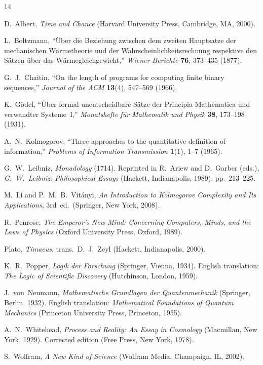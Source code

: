 \documentclass[12pt]{article}
\theoremstyle{plain}
\theoremstyle{definition}
\theoremstyle{remark}
\begin{document}
\begin{thebibliography}{14}

D.~Albert, \emph{Time and Chance} (Harvard University Press, Cambridge, MA, 2000).

L.~Boltzmann, ``\"Uber die Beziehung zwischen dem zweiten Hauptsatze der mechanischen W\"armetheorie und der Wahrscheinlichkeitsrechnung respektive den S\"atzen \"uber das W\"armegleichgewicht,'' \emph{Wiener Berichte} \textbf{76}, 373--435 (1877).

G.~J.~Chaitin, ``On the length of programs for computing finite binary sequences,'' \emph{Journal of the ACM} \textbf{13}(4), 547--569 (1966).

K.~G\"odel, ``\"Uber formal unentscheidbare S\"atze der Principia Mathematica und verwandter Systeme~I,'' \emph{Monatshefte f\"ur Mathematik und Physik} \textbf{38}, 173--198 (1931).

A.~N.~Kolmogorov, ``Three approaches to the quantitative definition of information,'' \emph{Problems of Information Transmission} \textbf{1}(1), 1--7 (1965).

G.~W.~Leibniz, \emph{Monadology} (1714). Reprinted in R.~Ariew and D.~Garber (eds.), \emph{G.~W.~Leibniz: Philosophical Essays} (Hackett, Indianapolis, 1989), pp.~213--225.

M.~Li and P.~M.~B.~Vit\'anyi, \emph{An Introduction to Kolmogorov Complexity and Its Applications}, 3rd~ed.\ (Springer, New York, 2008).

R.~Penrose, \emph{The Emperor's New Mind: Concerning Computers, Minds, and the Laws of Physics} (Oxford University Press, Oxford, 1989).

Plato, \emph{Timaeus}, trans.\ D.~J.~Zeyl (Hackett, Indianapolis, 2000).

K.~R.~Popper, \emph{Logik der Forschung} (Springer, Vienna, 1934). English translation: \emph{The Logic of Scientific Discovery} (Hutchinson, London, 1959).

J.~von~Neumann, \emph{Mathematische Grundlagen der Quantenmechanik} (Springer, Berlin, 1932). English translation: \emph{Mathematical Foundations of Quantum Mechanics} (Princeton University Press, Princeton, 1955).

A.~N.~Whitehead, \emph{Process and Reality: An Essay in Cosmology} (Macmillan, New York, 1929). Corrected edition (Free Press, New York, 1978).

S.~Wolfram, \emph{A New Kind of Science} (Wolfram Media, Champaign, IL, 2002).

\end{thebibliography}
\end{document}
